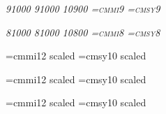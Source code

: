 \setfont{}
\setfont{}
\setfont{}
\def\df{\let\tentt=\deftt \let\tenbf = \defbf \let\tenttsl=\defttsl \bf}

\def\smallnominalsize{9pt}
\setfont\smallrm{}
\setfont\smalltt{}
\setfont\smallbf{}
\setfont\smallit\itshape{9}{1000}
\setfont\smallsl\slshape{9}{1000}
\setfont\smallsf{}
\setfont\smallsc\scshape{10}{900}
\setfont\smallttsl{}
\font\smalli=cmmi9
\font\smallsy=cmsy9

\def\smallernominalsize{8pt}
\setfont\smallerrm{}
\setfont\smallertt{}
\setfont\smallerbf{}
\setfont\smallerit\itshape{8}{1000}
\setfont\smallersl\slshape{8}{1000}
\setfont\smallersf{}
\setfont\smallersc\scshape{10}{800}
\setfont\smallerttsl{}
\font\smalleri=cmmi8
\font\smallersy=cmsy8

\def\titlenominalsize{20pt}
\setfont\titlerm{}
\setfont\titleit{}
\setfont\titlesl{}
\setfont\titlett{}
\setfont\titlettsl{}
\setfont\titlesf{}
\let\titlebf=\titlerm
\setfont\titlesc{}
\font\titlei=cmmi12 scaled 
\font\titlesy=cmsy10 scaled 
\def\authorrm{\secrm}
\def\authortt{\sectt}

\def\chapnominalsize{17pt}
\setfont\chaprm{}
\setfont\chapit{}
\setfont\chapsl{}
\setfont\chaptt{}
\setfont\chapttsl{}
\setfont\chapsf{}
\let\chapbf=\chaprm
\setfont\chapsc{}
\font\chapi=cmmi12 scaled 
\font\chapsy=cmsy10 scaled 

\def\secnominalsize{14pt}
\setfont\secrm{}
\setfont\secit{}
\setfont\secsl{}
\setfont\sectt{}
\setfont\secttsl{}
\setfont\secsf{}
\let\secbf\secrm
\setfont\secsc{}
\font\seci=cmmi12 scaled 
\font\secsy=cmsy10 scaled 

